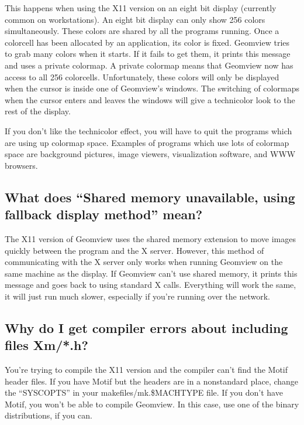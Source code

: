 \documentclass[12pt,a4paper]{article}
\begin{document}
        This happens when using the X11 version on an eight bit display
        (currently common on workstations). An eight bit display can only show
        256 colors simultaneously. These colors are shared by all the programs
        running. Once a colorcell has been allocated by an application, its
        color is fixed. Geomview tries to grab many colors when it starts. If it
        fails to get them, it prints this message and uses a private colormap. A
        private colormap means that Geomview now has access to all 256
        colorcells. Unfortunately, these colors will only be displayed when the
        cursor is inside one of Geomview's windows. The switching of colormaps
        when the cursor enters and leaves the windows will give a technicolor
        look to the rest of the display.

        If you don't like the technicolor effect, you will have to quit the
        programs which are using up colormap space. Examples of programs which
        use lots of colormap space are background pictures, image viewers,
        visualization software, and WWW browsers.

    \subsection{What does ``Shared memory unavailable, using fallback display method'' mean?}

        The X11 version of Geomview uses the shared memory extension to move
        images quickly between the program and the X server. However, this
        method of communicating with the X server only works when running
        Geomview on the same machine as the display. If Geomview can't use
        shared memory, it prints this message and goes back to using standard X
        calls. Everything will work the same, it will just run much slower,
        especially if you're running over the network.

    \subsection{Why do I get compiler errors about including files Xm/*.h?}

        You're trying to compile the X11 version and the compiler can't find the
        Motif header files. If you have Motif but the headers are in a
        nonstandard place, change the ``SYSCOPTS'' in your
        makefiles/mk.\${MACHTYPE} file. If you don't have Motif, you won't be
        able to compile Geomview. In this case, use one of the binary
        distributions, if you can.
\end{document}
